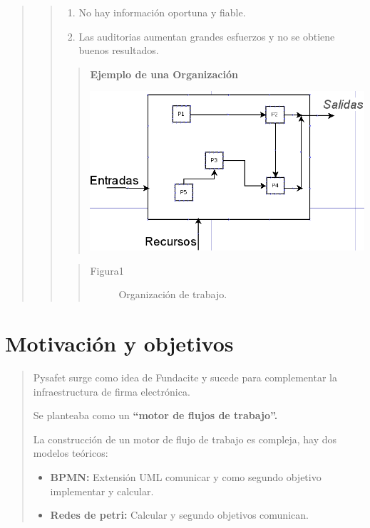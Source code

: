 \documentclass[letterpaper,11pt,spanish]{sphinxmanual}
\begin{document}
\begin{quote}
\begin{quote}
\begin{enumerate}
\item {} 
No hay información oportuna y fiable.

\item {} 
Las auditorias aumentan grandes esfuerzos y no se obtiene buenos resultados.

\end{enumerate}
\begin{quote}

\textbf{Ejemplo de una Organización}

\includegraphics{Organizacion.png}
\end{quote}
\begin{quote}\begin{description}
\item[{Figura1}] \leavevmode
Organización de trabajo.

\end{description}\end{quote}
\end{quote}
\end{quote}


\chapter{Motivación y objetivos}
\label{_templates/Contenido1/Introduccion:motivacion-y-objetivos}\begin{quote}

Pysafet surge como idea de Fundacite y sucede para complementar la infraestructura de firma electrónica.

Se planteaba como un \textbf{``motor de flujos de trabajo''.}

La construcción de un motor de flujo de trabajo es compleja, hay dos modelos teóricos:
\begin{itemize}
\item {} 
\textbf{BPMN:} Extensión UML comunicar y como segundo objetivo implementar y calcular.

\item {} 
\textbf{Redes de petri:} Calcular y segundo objetivos comunican.

\end{itemize}
\end{quote}
\end{document}
